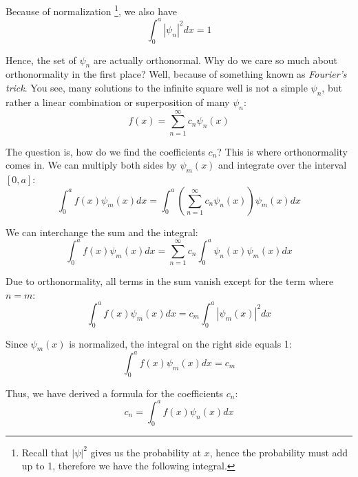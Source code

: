Because of normalization \footnote{Recall that \(|\psi|^2\) gives us the probability at \(x\), hence the probability must add up to 1, therefore we have the following integral.}, we also have
\begin{equation}
  \int_0^a |\psi_n|^2 dx = 1
\end{equation}


Hence, the set of \({\psi_n}\) are actually orthonormal. Why do we care so much about orthonormality in the first place? Well, because of something known as \textit{Fourier's trick}. You see, many solutions to the infinite square well is not a simple \(\psi_n\), but rather a linear combination or superposition of many \(\psi_n\):
\begin{equation}
  f(x) = \sum_{n=1}^{\infty} c_n \psi_n(x)
\end{equation}


The question is, how do we find the coefficients \(c_n\)? This is where orthonormality comes in. We can multiply both sides by \(\psi_m(x)\) and integrate over the interval \([0,a]\):
\begin{equation*}
  \int_0^a f(x) \psi_m(x) dx = \int_0^a \left(\sum_{n=1}^{\infty} c_n \psi_n(x)\right) \psi_m(x) dx
\end{equation*}


We can interchange the sum and the integral:
\begin{equation*}
  \int_0^a f(x) \psi_m(x) dx = \sum_{n=1}^{\infty} c_n \int_0^a \psi_n(x) \psi_m(x) dx
\end{equation*}


Due to orthonormality, all terms in the sum vanish except for the term where \(n = m\):
\begin{equation*}
  \int_0^a f(x) \psi_m(x) dx = c_m \int_0^a |\psi_m(x)|^2 dx
\end{equation*}


Since \(\psi_m(x)\) is normalized, the integral on the right side equals 1:
\begin{equation*}
  \int_0^a f(x) \psi_m(x) dx = c_m
\end{equation*}


Thus, we have derived a formula for the coefficients \(c_n\):
\begin{equation}
  c_n = \int_0^a f(x) \psi_n(x) dx
\end{equation}




